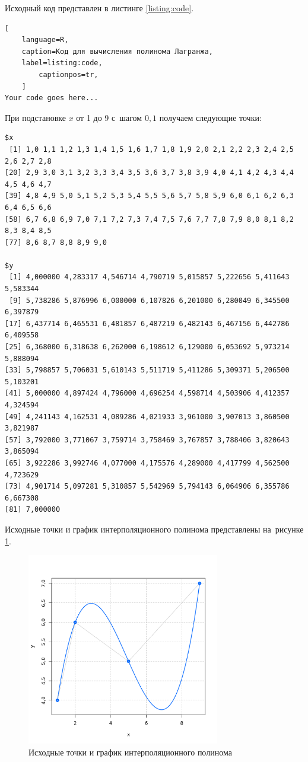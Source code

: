 \documentclass[14pt]{extarticle}
\begin{document}
Исходный код представлен в листинге \ref{listing:code}.

\begin{lstlisting}[
	language=R,
	caption=Код для вычисления полинома Лагранжа,
	label=listing:code,
        captionpos=tr,
	]
Your code goes here...
\end{lstlisting}

При подстановке $x$ от 1 до 9 с~шагом $0{,}1$ получаем следующие точки:

\begin{lstlisting}
$x
 [1] 1,0 1,1 1,2 1,3 1,4 1,5 1,6 1,7 1,8 1,9 2,0 2,1 2,2 2,3 2,4 2,5 2,6 2,7 2,8
[20] 2,9 3,0 3,1 3,2 3,3 3,4 3,5 3,6 3,7 3,8 3,9 4,0 4,1 4,2 4,3 4,4 4,5 4,6 4,7
[39] 4,8 4,9 5,0 5,1 5,2 5,3 5,4 5,5 5,6 5,7 5,8 5,9 6,0 6,1 6,2 6,3 6,4 6,5 6,6
[58] 6,7 6,8 6,9 7,0 7,1 7,2 7,3 7,4 7,5 7,6 7,7 7,8 7,9 8,0 8,1 8,2 8,3 8,4 8,5
[77] 8,6 8,7 8,8 8,9 9,0

$y
 [1] 4,000000 4,283317 4,546714 4,790719 5,015857 5,222656 5,411643 5,583344
 [9] 5,738286 5,876996 6,000000 6,107826 6,201000 6,280049 6,345500 6,397879
[17] 6,437714 6,465531 6,481857 6,487219 6,482143 6,467156 6,442786 6,409558
[25] 6,368000 6,318638 6,262000 6,198612 6,129000 6,053692 5,973214 5,888094
[33] 5,798857 5,706031 5,610143 5,511719 5,411286 5,309371 5,206500 5,103201
[41] 5,000000 4,897424 4,796000 4,696254 4,598714 4,503906 4,412357 4,324594
[49] 4,241143 4,162531 4,089286 4,021933 3,961000 3,907013 3,860500 3,821987
[57] 3,792000 3,771067 3,759714 3,758469 3,767857 3,788406 3,820643 3,865094
[65] 3,922286 3,992746 4,077000 4,175576 4,289000 4,417799 4,562500 4,723629
[73] 4,901714 5,097281 5,310857 5,542969 5,794143 6,064906 6,355786 6,667308
[81] 7,000000
\end{lstlisting}

Исходные точки и график интерполяционного полинома представлены на~рисунке \ref{fig:interpolated}.

\begin{figure}[!h]
	\centering
	\includegraphics[width=0.75\textwidth]{interpolated.png}
	\caption{Исходные точки и график интерполяционного полинома}
	\label{fig:interpolated}
\end{figure}
\end{document}
